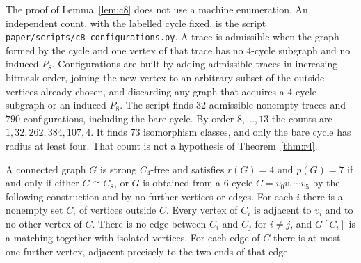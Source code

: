 \documentclass[ASNA]{USG}
\theoremstyle{WBstyletwo}
\numberwithin{equation}{section}
\newcommand{\pp}{p}
\begin{document}
\begin{remark}\label{rem:c8enum}
The proof of Lemma~\ref{lem:c8} does not use a machine enumeration. An independent count, with the labelled cycle fixed, is the script \texttt{paper/scripts/c8\_configurations.py}. A trace is admissible when the graph formed by the cycle and one vertex of that trace has no $4$-cycle subgraph and no induced $P_8$. Configurations are built by adding admissible traces in increasing bitmask order, joining the new vertex to an arbitrary subset of the outside vertices already chosen, and discarding any graph that acquires a $4$-cycle subgraph or an induced $P_8$. The script finds $32$ admissible nonempty traces and $790$ configurations, including the bare cycle. By order $8,\dots,13$ the counts are $1,32,262,384,107,4$. It finds $73$ isomorphism classes, and only the bare cycle has radius at least four. That count is not a hypothesis of Theorem~\ref{thm:r4}.
\end{remark}

\begin{theorem}\label{thm:r4}
A connected graph $G$ is strong $C_4$-free and satisfies $r(G)=4$ and $\pp(G)=7$ if and only if either $G\cong C_8$, or $G$ is obtained from a $6$-cycle $C=v_0v_1\cdots v_5$ by the following construction and by no further vertices or edges. For each $i$ there is a nonempty set $C_i$ of vertices outside $C$. Every vertex of $C_i$ is adjacent to $v_i$ and to no other vertex of $C$. There is no edge between $C_i$ and $C_j$ for $i\ne j$, and $G[C_i]$ is a matching together with isolated vertices. For each edge of $C$ there is at most one further vertex, adjacent precisely to the two ends of that edge.
\end{theorem}
\end{document}
